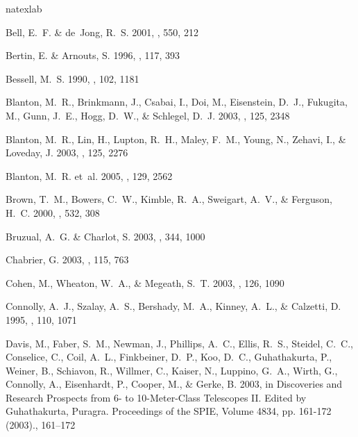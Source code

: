 \documentclass[12pt,preprint]{aastex}
\begin{document}
\begin{thebibliography}{44}
\expandafter\ifx\csname natexlab\endcsname\relax\def\natexlab#1{#1}\fi

{Bell}, E.~F. \& {de~Jong}, R.~S. 2001, \apj, 550, 212

{Bertin}, E. \& {Arnouts}, S. 1996, \aaps, 117, 393

{Bessell}, M.~S. 1990, \pasp, 102, 1181

Blanton, M.~R., Brinkmann, J., Csabai, I., Doi, M., Eisenstein, D.~J.,
  Fukugita, M., Gunn, J.~E., Hogg, D.~W., \& Schlegel, D.~J. 2003, \aj, 125,
  2348

{Blanton}, M.~R., {Lin}, H., {Lupton}, R.~H., {Maley}, F.~M., {Young}, N.,
  {Zehavi}, I., \& {Loveday}, J. 2003, \aj, 125, 2276

{Blanton}, M.~R. {et~al.} 2005, \aj, 129, 2562

{Brown}, T.~M., {Bowers}, C.~W., {Kimble}, R.~A., {Sweigart}, A.~V., \&
  {Ferguson}, H.~C. 2000, \apj, 532, 308

Bruzual, A.~G. \& Charlot, S. 2003, \mnras, 344, 1000

{Chabrier}, G. 2003, \pasp, 115, 763

{Cohen}, M., {Wheaton}, W.~A., \& {Megeath}, S.~T. 2003, \aj, 126, 1090

{Connolly}, A.~J., {Szalay}, A.~S., {Bershady}, M.~A., {Kinney}, A.~L., \&
  {Calzetti}, D. 1995, \aj, 110, 1071

{Davis}, M., {Faber}, S.~M., {Newman}, J., {Phillips}, A.~C., {Ellis}, R.~S.,
  {Steidel}, C.~C., {Conselice}, C., {Coil}, A.~L., {Finkbeiner}, D.~P., {Koo},
  D.~C., {Guhathakurta}, P., {Weiner}, B., {Schiavon}, R., {Willmer}, C.,
  {Kaiser}, N., {Luppino}, G.~A., {Wirth}, G., {Connolly}, A., {Eisenhardt},
  P., {Cooper}, M., \& {Gerke}, B. 2003, in Discoveries and Research Prospects
  from 6- to 10-Meter-Class Telescopes II. Edited by Guhathakurta, Puragra.
  Proceedings of the SPIE, Volume 4834, pp. 161-172 (2003)., 161--172


\end{thebibliography}
\end{document}
